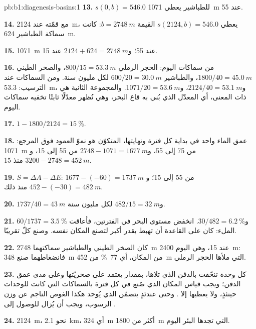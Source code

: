 \begin{solution}{pb:b1:diagenesis-basins:1}
\textbf{13.} $s(0, b) = 546.0$ للطباشير يعطي \qty{1071}{m} عند \qty{55}{\Ma}.

\textbf{14.} مع قمّته عند \qty{2124}{m}، يعطي $s(2124, b) = 546.0$ القيمة $b =
\qty{2748}{m}$: كانت سماكة الطباشير \qty{624}{m}.

\textbf{15.} \qty{1071}{m} عند \qty{55}{\Ma}؛ و$2124 + 624 = \qty{2748}{m}$ عند
\qty{15}{\Ma}.

\textbf{16.} من سماكات اليوم: الحجر الرملي $800/15 = \qty{53.3}{m}$،
والصخر الطيني $1800/40 = \qty{45.0}{m}$، والطباشير $600/20 = \qty{30.0}{m}$ لكل مليون
سنة. ومن السماكات عند الترسيب: \qty{53.3}{m}، و$2124/40 =
\qty{53.1}{m}$، و$1071/20 = \qty{53.6}{m}$. والمجموعة الثانية هي ذات المعنى، أي المعدّل الذي بُني به قاع البحر، وهي تُظهر معدّلًا ثابتًا تخفيه سماكات اليوم.

\textbf{17.} $1 - 1800/2124 = \qty{15}{\%}$.

\textbf{18.} عمق الماء واحد في بداية كل فترة ونهايتها،  المتكوّن هو نموّ العمود فوق المرجع: \qty{1071}{m} من 75 إلى \qty{55}{\Ma}، و$2748 - 1071 = \qty{1677}{m}$ من 55 إلى \qty{15}{\Ma}، و$3200 - 2748 = \qty{452}{m}$ منذ \qty{15}{\Ma}.

\textbf{19.} $S = \Delta A - \Delta E$: $1677 - (-60) = \qty{1737}{m}$ من 55 إلى \qty{15}{\Ma}؛ و$452 - (-30) = \qty{482}{m}$ منذ ذلك.

\textbf{20.} $1737/40 = \qty{43}{m}$ و$482/15 = \qty{32}{m}$ لكل مليون سنة.

\textbf{21.} $60/1737 = \qty{3.5}{\%}$ و$30/482 = \qty{6.2}{\%}$. انخفض مستوى البحر في الفترتين، فأعاقت  الملء: كان على القاعدة أن تهبط بقدر أكبر لتصنع المكان نفسه. وصنع  كلّ  تقريبًا.

\textbf{22.} كان الصخر الطيني والطباشير سماكتهما \qty{2748}{m} عند \qty{15}{\Ma}، وهي اليوم \qty{2400}{m}: فانضغاطهما صنع \qty{348}{m} من المكان، أي \qty{77}{\%} من \qty{452}{m} التي ملأها الحجر الرملي.

\textbf{23.} كل وحدة تنحّفت بالدفن الذي تلاها، بمقدار يعتمد على صخريّتها وعلى مدى عمق الدفن؛ ويجب قياس المكان الذي صُنع في كل فترة بالسماكات التي كانت للوحدات حينئذٍ، ولا يعطيها إلا . وحتى عندئذٍ يتضمّن  الذي يُوجد هكذا الغوص الناجم عن وزن الرسوب، ويجب أن يُزال للوصول إلى .

\textbf{24.} \qty{2124}{m}، نحو \qty{2.1}{km}، أي \qty{324}{m} أكثر من \qty{1800}{m} التي تجدها البئر اليوم.
\end{solution}
